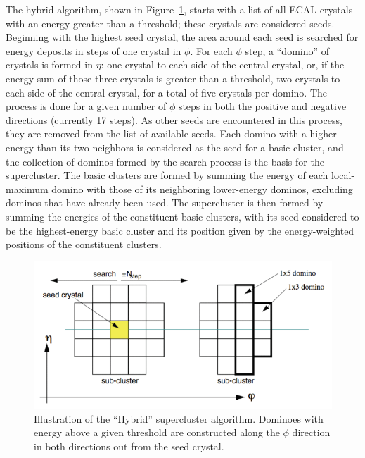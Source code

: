 The hybrid algorithm, 
shown in Figure~\ref{fig:HybridSuperCluster}, 
starts with a list of all 
ECAL crystals with an energy greater than a threshold; 
these crystals are considered seeds.  
Beginning with the highest seed crystal, 
the area around each seed is searched for 
energy deposits in steps of one crystal in $\phi$.
For each $\phi$ step, a ``domino'' of crystals is 
formed in $\eta$: 
one crystal to each side of the central crystal, 
or, if the energy sum of those three crystals is 
greater than a threshold, 
two crystals to each side of the central crystal, 
for a total of five crystals per domino.  
The process is done for a given number of $\phi$ 
steps in both the positive and negative directions 
(currently 17 steps).  
As other seeds are encountered in this process, 
they are removed from the list of available seeds.  
Each domino with a higher energy than its two neighbors 
is considered as the seed for a basic cluster, 
and the collection of dominos formed by the search 
process is the basis for the supercluster.  
The basic clusters are formed by summing the 
energy of each local-maximum domino with 
those of its neighboring lower-energy dominos, 
excluding dominos that have already been used.  
The supercluster is then formed by summing the energies 
of the constituent basic clusters, 
with its seed considered to be the highest-energy 
basic cluster 
and its position given by the energy-weighted positions 
of the constituent clusters.  

 \begin{figure}[htb]
  \begin{center}
    \includegraphics[width=360pt]{Figures/elec-SC-hybrid-algo.png}
  \end{center}
  \caption[\fixspacing Illustration of the ``Hybrid'' supercluster algorithm]
	  {\fixspacing Illustration of the ``Hybrid'' supercluster algorithm. 
	    Dominoes with energy above a given threshold are constructed 
	    along the $\phi$ direction in both directions out from the seed crystal.  
	  }
  \label{fig:HybridSuperCluster}
 \end{figure}



